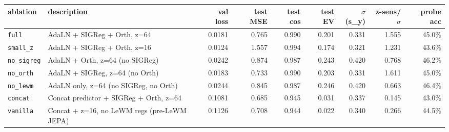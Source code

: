 \begin{tabular}{llrrrrrrr}
\toprule
ablation & description & val loss & test MSE & test cos & test EV & $\sigma$(s_y) & z-sens/$\sigma$ & probe acc \\
\midrule
\texttt{full} & AdaLN + SIGReg + Orth, z=64 & 0.0181 & 0.765 & 0.990 & 0.201 & 0.331 & 1.555 & 45.0\% \\
\texttt{small\_z} & AdaLN + SIGReg + Orth, z=16 & 0.0124 & 1.557 & 0.994 & 0.174 & 0.321 & 1.231 & 43.6\% \\
\texttt{no\_sigreg} & AdaLN + Orth, z=64 (no SIGReg) & 0.0242 & 0.874 & 0.987 & 0.243 & 0.420 & 0.768 & 46.2\% \\
\texttt{no\_orth} & AdaLN + SIGReg, z=64 (no Orth) & 0.0183 & 0.733 & 0.990 & 0.203 & 0.331 & 1.611 & 45.0\% \\
\texttt{no\_lewm} & AdaLN only, z=64 (no SIGReg, no Orth) & 0.0244 & 0.845 & 0.987 & 0.246 & 0.420 & 0.663 & 46.4\% \\
\texttt{concat} & Concat predictor + SIGReg + Orth, z=64 & 0.1081 & 0.685 & 0.945 & 0.031 & 0.337 & 0.145 & 43.0\% \\
\texttt{vanilla} & Concat + z=16, no LeWM regs (pre-LeWM JEPA) & 0.1126 & 0.708 & 0.944 & 0.022 & 0.340 & 0.266 & 44.5\% \\
\bottomrule
\end{tabular}